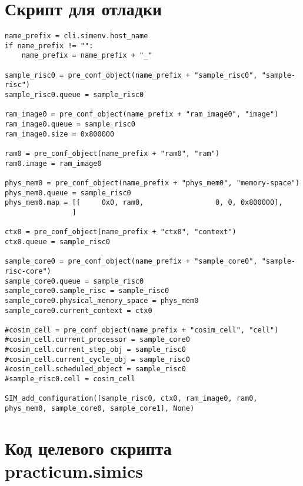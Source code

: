 \chapter{Скрипт для отладки}\label{chap:app-broken-script}

\begin{lstlisting}
name_prefix = cli.simenv.host_name
if name_prefix != "":
    name_prefix = name_prefix + "_"

sample_risc0 = pre_conf_object(name_prefix + "sample_risc0", "sample-risc")
sample_risc0.queue = sample_risc0

ram_image0 = pre_conf_object(name_prefix + "ram_image0", "image")
ram_image0.queue = sample_risc0
ram_image0.size = 0x800000

ram0 = pre_conf_object(name_prefix + "ram0", "ram")
ram0.image = ram_image0

phys_mem0 = pre_conf_object(name_prefix + "phys_mem0", "memory-space")
phys_mem0.queue = sample_risc0
phys_mem0.map = [[     0x0, ram0,                 0, 0, 0x800000],
                ]

ctx0 = pre_conf_object(name_prefix + "ctx0", "context")
ctx0.queue = sample_risc0

sample_core0 = pre_conf_object(name_prefix + "sample_core0", "sample-risc-core")
sample_core0.queue = sample_risc0
sample_core0.sample_risc = sample_risc0
sample_core0.physical_memory_space = phys_mem0
sample_core0.current_context = ctx0

#cosim_cell = pre_conf_object(name_prefix + "cosim_cell", "cell")
#cosim_cell.current_processor = sample_core0
#cosim_cell.current_step_obj = sample_risc0
#cosim_cell.current_cycle_obj = sample_risc0
#cosim_cell.scheduled_object = sample_risc0
#sample_risc0.cell = cosim_cell

SIM_add_configuration([sample_risc0, ctx0, ram_image0, ram0, phys_mem0, sample_core0, sample_core1], None)
\end{lstlisting}

\chapter{Код целевого скрипта practicum.simics}\label{chap:target-script}

